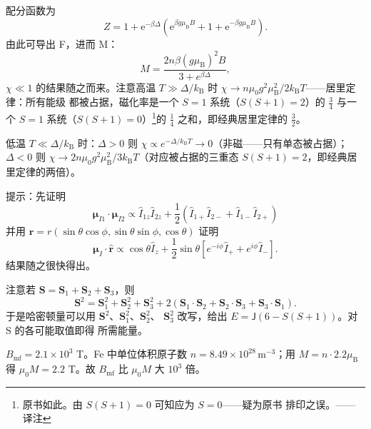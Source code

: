  配分函数为
\begin{equation*}
Z = 1+\mathrm{e}^{-\beta\Delta}(\mathrm{e}^{\beta g\mu_{\mathrm{B}}B}+1+\mathrm{e}^{-\beta g\mu_{\mathrm{B}}B}).\tag{F.35}
\end{equation*}
由此可导出 F，进而 M：
\begin{equation*}
M = \frac{2n\beta(g\mu_{\mathrm{B}})^{2}B}{3+e^{\beta\Delta}},\tag{F.36}
\end{equation*}
$\chi\ll1$ 的结果随之而来。注意高温 $T\gg\Delta/k_{\mathrm{B}}$ 时
$\chi\to n\mu_0g^{2}\mu_{\mathrm{B}}^{2}/2k_{\mathrm{B}}T$——居里定律：所有能级
都被占据，磁化率是一个 $S=1$ 系统（$S(S+1)=2$）的 $\frac{3}{4}$ 与一个 $S=1$
系统（$S(S+1)=0$）\footnote{原书如此。由 $S(S+1)=0$ 可知应为 $S=0$——疑为原书
排印之误。——译注}的 $\frac{1}{4}$ 之和，即经典居里定律的 $\frac{3}{2}$。

低温 $T\ll\Delta/k_{\mathrm{B}}$ 时：$\Delta>0$ 则
$\chi\propto e^{-\Delta/k_{\mathrm{B}}T}\to0$（非磁——只有单态被占据）；$\Delta<0$
则 $\chi\to2n\mu_0g^{2}\mu_{\mathrm{B}}^{2}/3k_{\mathrm{B}}T$（对应被占据的三重态
$S(S+1)=2$，即经典居里定律的两倍）。

 提示：先证明
\begin{equation*}
\boldsymbol{\mu}_{I1}\cdot\boldsymbol{\mu}_{I2} \propto \hat{I}_{1z}\hat{I}_{2z} + \frac{1}{2}(\hat{I}_{1+}\hat{I}_{2-}+\hat{I}_{1-}\hat{I}_{2+})\tag{F.37}
\end{equation*}
并用 $\mathbf{r}=r(\sin\theta\cos\phi,\sin\theta\sin\phi,\cos\theta)$ 证明
\begin{equation*}
\boldsymbol{\mu}_I\cdot\hat{\mathbf{r}} \propto \cos\theta\hat{I}_z + \frac{1}{2}\sin\theta[e^{-i\phi}\hat{I}_{+}+e^{i\phi}\hat{I}_{-}].\tag{F.38}
\end{equation*}
结果随之很快得出。

 注意若 $\mathbf{S}=\mathbf{S}_1+\mathbf{S}_2+\mathbf{S}_3$，则
\begin{equation*}
\mathbf{S}^{2} = \mathbf{S}_1^{2}+\mathbf{S}_2^{2}+\mathbf{S}_3^{2} + 2(\mathbf{S}_1\cdot\mathbf{S}_2+\mathbf{S}_2\cdot\mathbf{S}_3+\mathbf{S}_3\cdot\mathbf{S}_1).\tag{F.39}
\end{equation*}
于是哈密顿量可以用 $\mathbf{S}^{2}$、$\mathbf{S}_1^{2}$、$\mathbf{S}_2^{2}$、
$\mathbf{S}_3^{2}$ 改写，给出 $E=\mathsf{J}(6-S(S+1))$。对 S 的各可能取值即得
所需能量。

 $B_{\mathrm{mf}}=2.1\times10^{3}$ T。Fe 中单位体积原子数
$n=8.49\times10^{28}\,\mathrm{m^{-3}}$；用 $M=n\cdot2.2\mu_{\mathrm{B}}$ 得
$\mu_0M=2.2$ T。故 $B_{\mathrm{mf}}$ 比 $\mu_0M$ 大 $10^{3}$ 倍。

